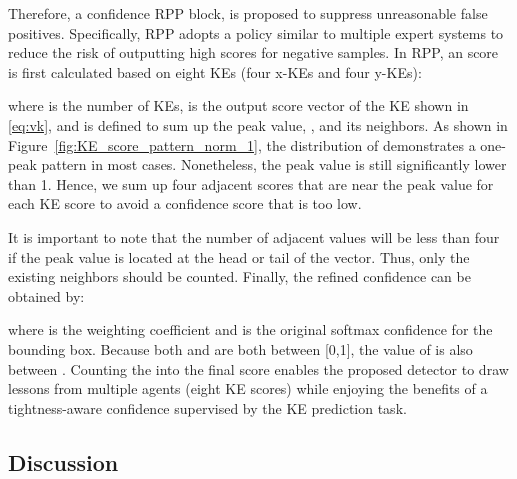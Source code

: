 Therefore, a confidence RPP block, is proposed to suppress unreasonable false positives. Specifically, RPP adopts a policy similar to multiple expert systems to reduce the risk of outputting high scores for negative samples. In RPP, an \Ours score  is first calculated based on eight KEs (four x-KEs and four y-KEs):

\noindent where  is the number of KEs,  is the output score vector of the  KE shown in \eqref{eq:vk}, and  is defined to sum up the peak value, , and its neighbors.
As shown in Figure~\ref{fig:KE_score_pattern_norm_1}, the distribution of  demonstrates a one-peak pattern in most cases. Nonetheless, the peak value is still significantly lower than 1. Hence, we sum up four adjacent scores that are near the peak value for each KE score to avoid a confidence score that is too low. 

\noindent It is important to note that the number of adjacent values will be less than four if the peak value is located at the head or tail of the vector. Thus, only the existing neighbors should be counted. Finally, the refined confidence can be obtained by:

\noindent where  is the weighting coefficient and  is the original softmax confidence for the bounding box.
Because both  and  are both between [0,1], the value of  is also between . Counting the  into the final score enables the proposed detector to draw lessons from multiple agents (eight KE scores) while enjoying the benefits of a tightness-aware confidence supervised by the KE prediction task.

\subsection{Discussion}


